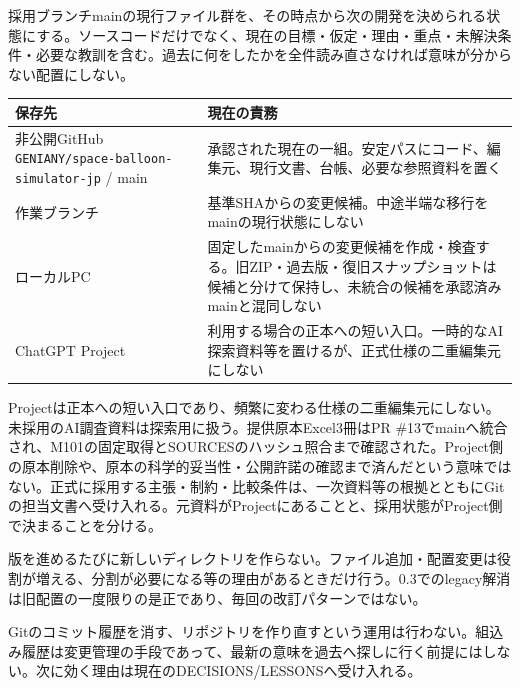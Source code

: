 \documentclass[11pt,a4paper]{article}
\newcounter{none}
\begin{document}
採用ブランチmainの現行ファイル群を、その時点から次の開発を決められる状態にする。ソースコードだけでなく、現在の目標・仮定・理由・重点・未解決条件・必要な教訓を含む。過去に何をしたかを全件読み直さなければ意味が分からない配置にしない。

{\def\LTcaptype{none} %
\begin{longtable}[]{@{}
  >{\raggedright\arraybackslash}p{}
  >{\raggedright\arraybackslash}p{}@{}}
\toprule\noalign{}
\begin{minipage}[b]{\linewidth}\raggedright
保存先
\end{minipage} & \begin{minipage}[b]{\linewidth}\raggedright
現在の責務
\end{minipage} \\
\midrule\noalign{}
\endhead
\bottomrule\noalign{}
\endlastfoot
非公開GitHub \texttt{GENIANY/space-balloon-simulator-jp} / main &
承認された現在の一組。安定パスにコード、編集元、現行文書、台帳、必要な参照資料を置く \\
作業ブランチ &
基準SHAからの変更候補。中途半端な移行をmainの現行状態にしない \\
ローカルPC &
固定したmainからの変更候補を作成・検査する。旧ZIP・過去版・復旧スナップショットは候補と分けて保持し、未統合の候補を承認済みmainと混同しない \\
ChatGPT Project &
利用する場合の正本への短い入口。一時的なAI探索資料等を置けるが、正式仕様の二重編集元にしない \\
\end{longtable}
}

Projectは正本への短い入口であり、頻繁に変わる仕様の二重編集元にしない。未採用のAI調査資料は探索用に扱う。提供原本Excel3冊はPR
\#13でmainへ統合され、M101の固定取得とSOURCESのハッシュ照合まで確認された。Project側の原本削除や、原本の科学的妥当性・公開許諾の確認まで済んだという意味ではない。正式に採用する主張・制約・比較条件は、一次資料等の根拠とともにGitの担当文書へ受け入れる。元資料がProjectにあることと、採用状態がProject側で決まることを分ける。

版を進めるたびに新しいディレクトリを作らない。ファイル追加・配置変更は役割が増える、分割が必要になる等の理由があるときだけ行う。0.3でのlegacy解消は旧配置の一度限りの是正であり、毎回の改訂パターンではない。

Gitのコミット履歴を消す、リポジトリを作り直すという運用は行わない。組込み履歴は変更管理の手段であって、最新の意味を過去へ探しに行く前提にはしない。次に効く理由は現在のDECISIONS/LESSONSへ受け入れる。
\end{document}
